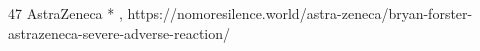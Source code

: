           {}
          {47}
          {AstraZeneca}
          {*}
          {
            ,
          }
          {https://nomoresilence.world/astra-zeneca/bryan-forster-astrazeneca-severe-adverse-reaction/}

